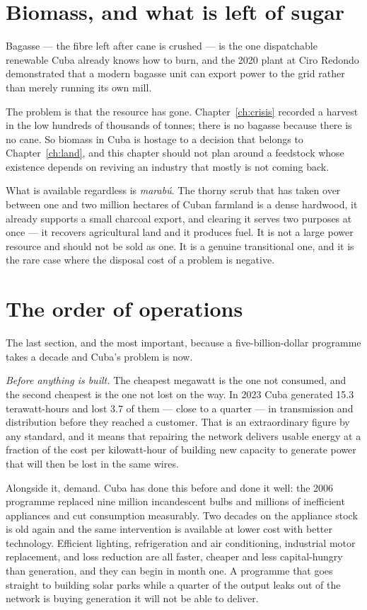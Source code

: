 \section{Biomass, and what is left of sugar}

Bagasse --- the fibre left after cane is crushed --- is the one dispatchable
renewable Cuba already knows how to burn, and the 2020 plant at Ciro Redondo
demonstrated that a modern bagasse unit can export power to the grid rather than
merely running its own mill.

The problem is that the resource has gone. Chapter~\ref{ch:crisis} recorded a
harvest in the low hundreds of thousands of tonnes; there is no bagasse because
there is no cane. So biomass in Cuba is hostage to a decision that belongs to
Chapter~\ref{ch:land}, and this chapter should not plan around a feedstock whose
existence depends on reviving an industry that mostly is not coming back.

What is available regardless is \emph{marab\'u}. The thorny scrub that has taken
over between one and two million hectares of Cuban farmland is a dense hardwood,
it already supports a small charcoal export, and clearing it serves two purposes
at once --- it recovers agricultural land and it produces fuel. It is not a
large power resource and should not be sold as one. It is a genuine transitional
one, and it is the rare case where the disposal cost of a problem is negative.

\section{The order of operations}

The last section, and the most important, because a five-billion-dollar
programme takes a decade and Cuba's problem is now.

\emph{Before anything is built.} The cheapest megawatt is the one not consumed,
and the second cheapest is the one not lost on the way. In 2023 Cuba generated
15.3 terawatt-hours and lost 3.7 of them --- close to a quarter --- in
transmission and distribution before they reached a customer.\unv{} That is an
extraordinary figure by any standard, and it means that repairing the network
delivers usable energy at a fraction of the cost per kilowatt-hour of building
new capacity to generate power that will then be lost in the same wires.

Alongside it, demand. Cuba has done this before and done it well: the 2006
programme replaced nine million incandescent bulbs and millions of inefficient
appliances and cut consumption measurably. Two decades on the appliance stock is
old again and the same intervention is available at lower cost with better
technology. Efficient lighting, refrigeration and air conditioning, industrial
motor replacement, and loss reduction are all faster, cheaper and less
capital-hungry than generation, and they can begin in month one. A programme
that goes straight to building solar parks while a quarter of the output leaks
out of the network is buying generation it will not be able to deliver.

